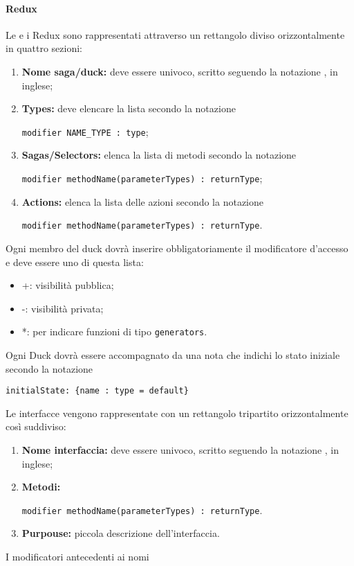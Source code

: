\documentclass[NormeDiProgetto.tex]{subfiles}
\begin{document}
\paragraph{Redux}
Le  e i  Redux sono rappresentati attraverso un rettangolo diviso orizzontalmente in quattro sezioni:
\begin{enumerate}
	\item \textbf{Nome saga/duck:} deve essere univoco, scritto seguendo la notazione , in inglese;
	\item \textbf{Types:} deve elencare la lista secondo la notazione 
	\begin{center}
		\texttt{modifier NAME\_TYPE : type};
	\end{center}
	\item \textbf{Sagas/Selectors:} elenca la lista di metodi secondo la notazione 
	\begin{center}
		\texttt{modifier methodName(parameterTypes) : returnType};
	\end{center}
	\item \textbf{Actions:} elenca la lista delle azioni secondo la notazione 
	\begin{center}
		\texttt{modifier methodName(parameterTypes) : returnType}.
	\end{center}
\end{enumerate}
Ogni membro del duck dovrà inserire obbligatoriamente il modificatore d'accesso e deve essere uno di questa lista:
\begin{itemize}
	\item +: visibilità pubblica;
	\item -: visibilità privata;
	\item *: per indicare funzioni di tipo \texttt{generators}.
\end{itemize}
Ogni Duck dovrà essere accompagnato da una nota che indichi lo stato iniziale secondo la notazione
\begin{center}
	\texttt{initialState: \{name : type = default\}}
\end{center}
Le interfacce vengono rappresentate con un rettangolo tripartito orizzontalmente così suddiviso:
\begin{enumerate}
	\item \textbf{Nome interfaccia:} deve essere univoco, scritto seguendo la notazione , in inglese;
	\item \textbf{Metodi:} 	
	\begin{center}
		\texttt{modifier methodName(parameterTypes) : returnType}.
	\end{center}
	\item \textbf{Purpouse:} piccola descrizione dell'interfaccia.
\end{enumerate}
I modificatori antecedenti ai nomi 
\end{document}
